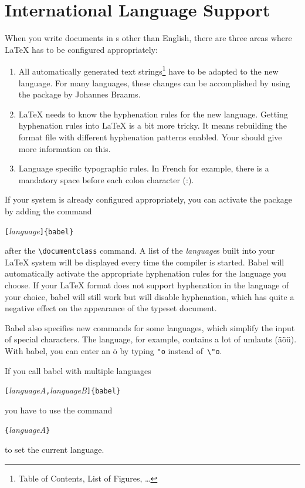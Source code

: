 \section{International Language Support}
 When you write documents in s
other than English, there are three areas where \LaTeX{} has to be
configured appropriately:

\begin{enumerate}
\item All automatically generated text strings\footnote{Table of
    Contents, List of Figures, \ldots} have to be adapted to the new
  language.  For many languages, these changes can be accomplished by
  using the  package by Johannes Braams.
\item \LaTeX{} needs to know the hyphenation rules for the new
  language. Getting hyphenation rules into \LaTeX{} is a bit more
  tricky. It means rebuilding the format file with different
  hyphenation patterns enabled. Your \guide{} should give more
  information on this.
\item Language specific typographic rules. In French for example, there is a
  mandatory space before each colon character (:).
\end{enumerate}

If your system is already configured appropriately, you can activate
the  package by adding the command
\begin{lscommand}
\verb|[|\emph{language}\verb|]{babel}| 
\end{lscommand}
\noindent after the \verb|\documentclass| command. A list of the
\emph{language}s built into your \LaTeX{} system will be displayed
every time the compiler is started. Babel will
automatically activate the appropriate hyphenation rules for the
language you choose. If your \LaTeX{} format does not support
hyphenation in the language of your choice, babel will still work but
will disable hyphenation, which has quite a negative effect on the
appearance of the typeset document.

\textsf{Babel} also specifies new commands for some languages, which
simplify the input of special characters. The  language, for
example, contains a lot of umlauts (\"a\"o\"u).  With \textsf{babel},
you can enter an \"o by typing \verb|"o| instead of~\verb|\"o|.

If you call babel with multiple languages
\begin{lscommand}
\verb|[|\emph{languageA}\verb|,|\emph{languageB}\verb|]{babel}| 
\end{lscommand}
\noindent you have to use the command
\begin{lscommand}
\verb|{|\emph{languageA}\verb|}|
\end{lscommand}
\noindent to set the current language.

